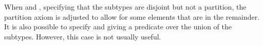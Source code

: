 When  and , specifying that the subtypes are disjoint but not a partition, the partition axiom is adjusted to allow for some elements that are in the remainder.
It is also possible to specify  and  giving a predicate over the union of the subtypes.
However, this case is not usually useful.
